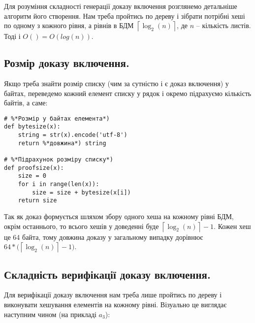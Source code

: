 \documentclass[a4paper, 12pt]{article}
\begin{document}
\par Для розуміння складності генерації доказу включення розглянемо детальніше алгоритм його створення. Нам треба пройтись по дереву і зібрати потрібні хеші по одному з кожного рівня, а рівнів в БДМ $\left\lceil \log_2(n)\right\rceil$, де $n$ -- кількість листів. Тоді і $O() = O(log(n))$.

\subsection{Розмір доказу включення.}

\par Якщо треба знайти розмір списку (чим за сутністю і є доказ включення) у байтах, переведемо кожний елемент списку у рядок і окремо підрахуємо кількість байтів, а саме:

\begin{lstlisting}
# %*Розмір у байтах елемента*)
def bytesize(x):
    string = str(x).encode('utf-8')
    return %*довжина*) string

# %*Підрахунок розміру списку*)
def proofsize(x):
    size = 0
    for i in range(len(x)):
        size = size + bytesize(x[i])
    return size
\end{lstlisting}

\par Так як доказ формується шляхом збору одного хеша на кожному рівні БДМ, окрім останнього, то всього хешів у доведенні буде $\left\lceil \log_2(n)\right\rceil - 1$. Кожен хеш це 64 байта, тому довжина доказу у загальному випадку дорівнює $64 * \big(\left\lceil \log_2(n)\right\rceil - 1\big)$.
	
\subsection{Складність верифікації доказу включення.}
\par Для верифікації доказу включення нам треба лише пройтись по дереву і виконувати хешування елементів на кожному рівні. Візуально це виглядає наступним чином (на прикладі $a_3$):
\end{document}
